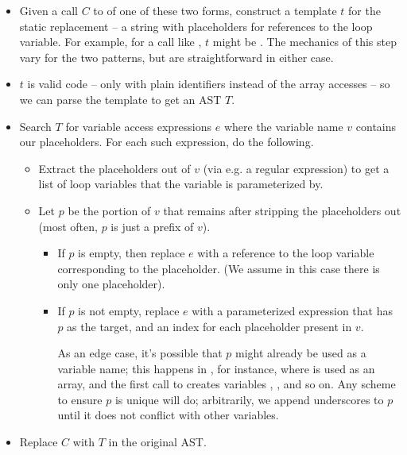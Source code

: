 \begin{itemize}

  \item Given a call $C$ to  of one of these two forms, construct a
    template $t$ for the static replacement -- a string with placeholders for
    references to the loop variable. For example, for a call like
    , $t$ might be
    . The mechanics of this step vary for the two
    patterns, but are straightforward in either case.

  \item $t$ is valid \matlab code -- only with plain identifiers instead
    of the array accesses -- so we can parse the template to get an AST $T$.

  \item Search $T$ for variable access expressions $e$ where the variable name
    $v$ contains our placeholders. For each such expression, do the following.

    \begin{itemize}

      \item Extract the placeholders out of $v$ (via e.g. a regular expression)
        to get a list of loop variables that the variable is parameterized by.

      \item Let $p$ be the portion of $v$ that remains after stripping the
        placeholders out (most often, $p$ is just a prefix of $v$).

      \begin{itemize}

        \item  If $p$ is empty, then replace $e$ with a reference to the loop
          variable corresponding to the placeholder. (We assume in this case
          there is only one placeholder).

        \item If $p$ is not empty, replace $e$ with a parameterized expression that
          has $p$ as the target, and an index for each placeholder present in
          $v$.

          As an edge case, it's possible that $p$ might already be used as a
          variable name; this happens in , for instance,
          where  is used as an array, and the first call to 
          creates variables , , and so on. Any scheme to ensure
          $p$ is unique will do; arbitrarily, we append underscores to $p$ until
          it does not conflict with other variables.

      \end{itemize}

    \end{itemize}

  \item Replace $C$ with $T$ in the original AST.

\end{itemize}

